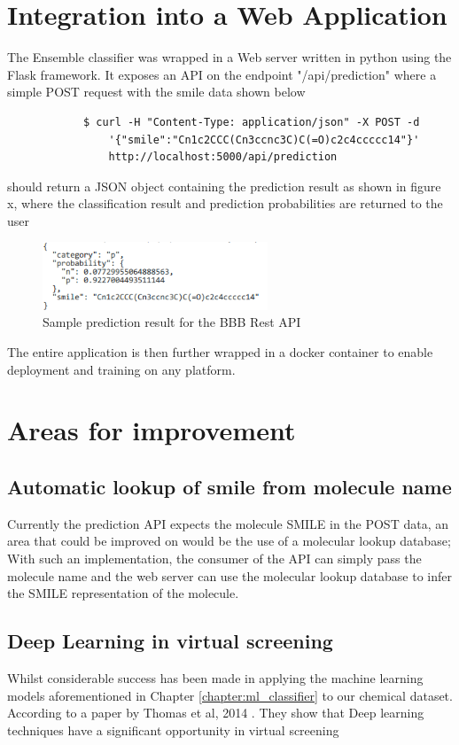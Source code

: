 \documentclass[a4paper,12pt]{report}
\begin{document}
	\section{Integration into a Web Application}
		The Ensemble classifier was wrapped in a Web server written in python using the Flask framework. It exposes an API on the endpoint "/api/prediction" where a simple POST request with the smile data shown below
		\begin{verbatim}
			$ curl -H "Content-Type: application/json" -X POST -d 
			    '{"smile":"Cn1c2CCC(Cn3ccnc3C)C(=O)c2c4ccccc14"}'   
			    http://localhost:5000/api/prediction
		\end{verbatim}
		should return a JSON object containing the prediction result as shown in figure x, where the classification result and prediction probabilities are returned to the user
			\begin{figure}[H]
				\centering
				\includegraphics[width=0.6\textwidth,scale=1]{images/sample_prediction_result}
				\caption{Sample prediction result for the BBB Rest API}
				\label{fig:bbb_sample_prediction_result}
			\end{figure}
		The entire application is then further wrapped in a docker container to enable deployment and training on any platform.
	\section{Areas for improvement}
		\subsection{Automatic lookup of smile from molecule name}
		Currently the prediction API expects the molecule SMILE in the POST data, an area that could be improved on would be the use of a molecular lookup database; With such an implementation, the consumer of the API can simply pass the molecule name and the web server can use the molecular lookup database to infer the SMILE representation of the molecule.
		
		\subsection{Deep Learning in virtual screening}
		Whilst considerable success has been made in applying the machine learning models aforementioned in Chapter \ref{chapter:ml_classifier} to our chemical dataset. According to a paper by Thomas et al, 2014 \cite{Thomasetal2014}. They show 
		that Deep learning techniques have a significant opportunity in virtual screening
\end{document}
